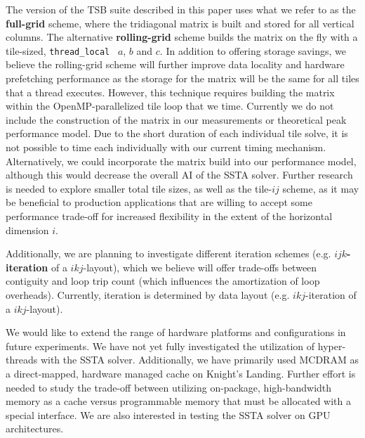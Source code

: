\documentclass{sig-alternate-05-2015}
\begin{document}
The version of the TSB suite described in this paper uses what we refer to as
  the \textbf{full-grid} scheme, where the tridiagonal matrix is built and stored
  for all vertical columns.
The alternative \textbf{rolling-grid} scheme builds the matrix on the fly with
  a tile-sized, \lstinline{thread_local}~\cite{cppreference_thread_local}
  \(a\), \(b\) and \(c\).
In addition to offering storage savings, we believe the rolling-grid scheme
  will further improve data locality and hardware prefetching performance as the
  storage for the matrix will be the same for all tiles that a thread
  executes.
However, this technique requires building the matrix within the
  OpenMP-parallelized tile loop that we time.
Currently we do not include the construction of the matrix in our measurements
  or theoretical peak performance model.
Due to the short duration of each individual tile solve, it is not possible to
  time each individually with our current timing mechanism.
Alternatively, we could incorporate the matrix build into our performance
  model, although this would decrease the overall AI of the SSTA solver.
Further research is needed to explore smaller total tile sizes, as well as the
  tile-\(ij\) scheme, as it may be beneficial to production applications
  that are willing to accept some performance trade-off for increased flexibility
  in the extent of the horizontal dimension \(i\).

Additionally, we are planning to investigate different iteration schemes (e.g.
  \textbf{\(ijk\)-iteration} of a \(ikj\)-layout), which we believe will offer
  trade-offs between contiguity and loop trip count (which influences the
  amortization of loop overheads).
Currently, iteration is determined by data layout (e.g. \(ikj\)-iteration of a
  \(ikj\)-layout).

We would like to extend the range of hardware platforms and configurations in
  future experiments.
We have not yet fully investigated the utilization of hyper-threads with the
  SSTA solver.
Additionally, we have primarily used MCDRAM as a direct-mapped, hardware
managed cache on Knight's Landing.
Further effort is needed to study the trade-off between utilizing on-package,
  high-bandwidth memory as a cache versus programmable memory that must be
  allocated with a special interface.
We are also interested in testing the SSTA solver on GPU
  architectures.
\end{document}
